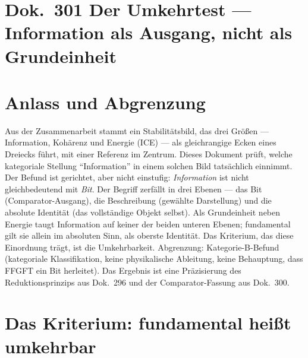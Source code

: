 
\section*{Dok.~301 \quad Der Umkehrtest --- Information als Ausgang, nicht
als Grundeinheit}

\section{Anlass und Abgrenzung}

Aus der Zusammenarbeit stammt ein Stabilitätsbild, das drei Größen ---
Information, Kohärenz und Energie (ICE) --- als gleichrangige Ecken eines
Dreiecks führt, mit einer Referenz im Zentrum. Dieses Dokument prüft, welche
kategoriale Stellung \enquote{Information} in einem solchen Bild tatsächlich
einnimmt. Der Befund ist gerichtet, aber nicht einstufig: \emph{Information}
ist nicht gleichbedeutend mit \emph{Bit}. Der Begriff zerfällt in drei Ebenen ---
das Bit (Comparator-Ausgang), die Beschreibung (gewählte Darstellung) und die
absolute Identität (das vollständige Objekt selbst). Als Grundeinheit neben
Energie taugt Information auf keiner der beiden unteren Ebenen; fundamental gilt
sie allein im absoluten Sinn, als oberste Identität. Das Kriterium, das diese
Einordnung trägt, ist die Umkehrbarkeit. Abgrenzung: Kategorie-B-Befund
(kategoriale Klassifikation, keine physikalische Ableitung, keine Behauptung,
dass FFGFT ein Bit herleitet). Das Ergebnis ist eine Präzisierung des
Reduktionsprinzips aus Dok.~296 und der Comparator-Fassung aus Dok.~300.

\section{Das Kriterium: fundamental heißt umkehrbar}

